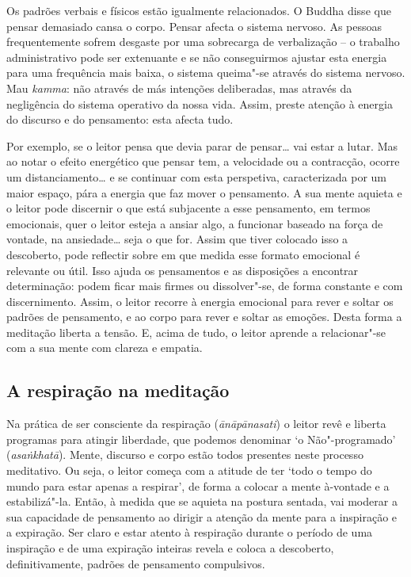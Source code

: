 Os padrões verbais e físicos estão igualmente relacionados. O Buddha disse que
pensar demasiado cansa o corpo.
Pensar afecta o sistema nervoso. As pessoas frequentemente sofrem desgaste por
uma sobrecarga de verbalização -- o trabalho administrativo pode ser extenuante
e se não conseguirmos ajustar esta energia para uma frequência mais baixa, o
sistema queima"-se através do sistema nervoso. Mau \emph{kamma}: não através de
más intenções deliberadas, mas através da negligência do sistema operativo da
nossa vida. Assim, preste atenção à energia do discurso e do pensamento: esta
afecta tudo.

Por exemplo, se o leitor pensa que devia parar de pensar\ldots{} vai estar a
lutar. Mas ao notar o efeito energético que pensar tem, a velocidade ou a
contracção, ocorre um distanciamento\ldots{} e se continuar com esta perspetiva,
caracterizada por um maior espaço, pára a energia que faz mover o pensamento. A
sua mente aquieta e o leitor pode discernir o que está subjacente a esse
pensamento, em termos emocionais, quer o leitor esteja a ansiar algo, a
funcionar baseado na força de vontade, na ansiedade\ldots{} seja o que for.
Assim que tiver colocado isso a descoberto, pode reflectir sobre em que medida
esse formato emocional é relevante ou útil. Isso ajuda os pensamentos e as
disposições a encontrar determinação: podem ficar mais firmes ou dissolver"-se,
de forma constante e com discernimento. Assim, o leitor recorre à energia
emocional para rever e soltar os padrões de pensamento, e ao corpo para rever e
soltar as emoções. Desta forma a meditação liberta a tensão. E, acima de tudo, o
leitor aprende a relacionar"-se com a sua mente com clareza e empatia.

\subsection{A respiração na meditação}

Na prática de ser consciente da respiração (\emph{ānāpānasati}) o leitor revê e
liberta programas para atingir liberdade, que podemos denominar `o
Não"-programado' (\emph{asaṅkhatā}). Mente, discurso e corpo estão todos
presentes neste processo meditativo. Ou seja, o leitor começa com a atitude de
ter `todo o tempo do mundo para estar apenas a respirar', de forma a colocar a
mente à-vontade e a estabilizá"-la. Então, à medida que se aquieta na postura
sentada, vai moderar a sua capacidade de pensamento ao dirigir a atenção da
mente para a inspiração e a expiração. Ser claro e estar atento à respiração
durante o período de uma inspiração e de uma expiração inteiras revela e coloca
a descoberto, definitivamente, padrões de pensamento compulsivos.

